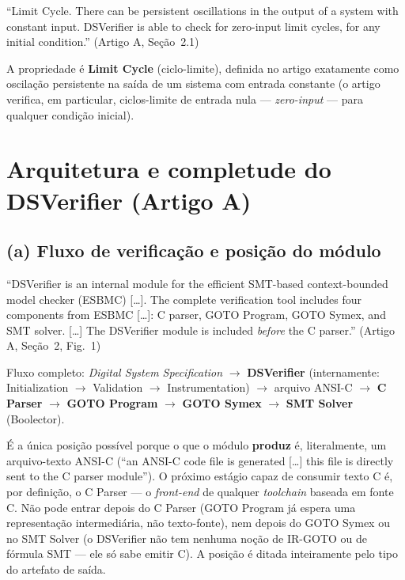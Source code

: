 \documentclass[12pt,a4paper]{article}
\begin{document}
\begin{tcolorbox}[quotebox]
``Limit Cycle. There can be persistent oscillations in the output of a system with constant
input. DSVerifier is able to check for zero-input limit cycles, for any initial condition.''
(Artigo A, Se\c{c}\~ao~2.1)
\end{tcolorbox}

\begin{tcolorbox}[resultbox]
A propriedade \'e \textbf{Limit Cycle} (ciclo-limite), definida no artigo exatamente como
oscila\c{c}\~ao persistente na sa\'ida de um sistema com entrada constante (o artigo
verifica, em particular, ciclos-limite de entrada nula --- \emph{zero-input} --- para
qualquer condi\c{c}\~ao inicial).
\end{tcolorbox}

\newpage

\section{Arquitetura e completude do DSVerifier (Artigo A)}

\subsection{(a) Fluxo de verificação e posição do módulo}

\begin{tcolorbox}[quotebox]
``DSVerifier is an internal module for the efficient SMT-based context-bounded model checker
(ESBMC) [\ldots]. The complete verification tool includes four components from ESBMC [\ldots]:
C parser, GOTO Program, GOTO Symex, and SMT solver. [\ldots] The DSVerifier module is included
\emph{before} the C parser.'' (Artigo A, Se\c{c}\~ao~2, Fig.~1)
\end{tcolorbox}

Fluxo completo: \emph{Digital System Specification} $\to$ \textbf{DSVerifier}
(internamente: Initialization $\to$ Validation $\to$ Instrumentation) $\to$ arquivo ANSI-C
$\to$ \textbf{C Parser} $\to$ \textbf{GOTO Program} $\to$ \textbf{GOTO Symex} $\to$
\textbf{SMT Solver} (Boolector).

\begin{tcolorbox}[notabox]
\'E a \'unica posi\c{c}\~ao poss\'ivel porque o que o m\'odulo \textbf{produz} \'e,
literalmente, um arquivo-texto ANSI-C (``an ANSI-C code file is generated [\ldots] this file
is directly sent to the C parser module''). O pr\'oximo est\'agio capaz de consumir texto C
\'e, por defini\c{c}\~ao, o C Parser --- o \emph{front-end} de qualquer \emph{toolchain}
baseada em fonte C. N\~ao pode entrar depois do C Parser (GOTO Program j\'a espera uma
representa\c{c}\~ao intermedi\'aria, n\~ao texto-fonte), nem depois do GOTO Symex ou no SMT
Solver (o DSVerifier n\~ao tem nenhuma no\c{c}\~ao de IR-GOTO ou de f\'ormula SMT --- ele
s\'o sabe emitir C). A posi\c{c}\~ao \'e ditada inteiramente pelo tipo do artefato de sa\'ida.
\end{tcolorbox}
\end{document}
